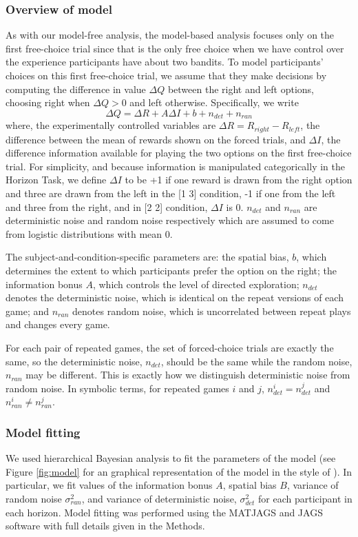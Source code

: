 \documentclass[12pt]{article}
\begin{document}
	\subsubsection*{Overview of model}
	As with our model-free analysis, the model-based analysis focuses only on the first free-choice trial since that is the only free choice when we have control over the experience participants have about two bandits. To model participants' choices on this first free-choice trial, we assume that they make decisions by computing the difference in value $\Delta Q$ between the right and left options, choosing right when $\Delta Q > 0$ and left otherwise.  Specifically, we write
	\begin{equation}
	\Delta Q= \Delta R+A \Delta I+b+n_{det}+n_{ran}
	\end{equation}
	where, the experimentally controlled variables are $\Delta R=R_{right}-R_{left}$, the difference between the mean of rewards shown on the forced trials, and $\Delta I$, the difference information available for playing the two options on the first free-choice trial. For simplicity, and because information is manipulated categorically in the Horizon Task, we define $\Delta I$ to be +1 if one reward is drawn from the right option and three are drawn from the left in the [1 3] condition, -1 if one from the left and three from the right, and in [2 2] condition, $\Delta I$ is 0. $n_{det}$ and $n_{ran}$ are deterministic noise and random noise respectively which are assumed to come from logistic distributions with mean 0.
	
	The subject-and-condition-specific parameters are: the spatial bias, $b$, which determines the extent to which participants prefer the option on the right; the information bonus $A$, which controls the level of directed exploration; $n_{det}$ denotes the deterministic noise, which is identical on the repeat versions of each game; and $n_{ran}$ denotes random noise, which is uncorrelated between repeat plays and changes every game.
	
	For each pair of repeated games, the set of forced-choice trials are exactly the same, so the deterministic noise, $n_{det}$, should be the same while the random noise, $n_{ran}$ may be different. This is exactly how we distinguish deterministic noise from random noise. In symbolic terms, for repeated games $i$ and $j$,  $n_{det}^i=n_{det}^j$  and $n_{ran}^i \neq n_{ran}^j$.
	
	
	\subsubsection*{Model fitting}
	We used hierarchical Bayesian analysis to fit the parameters of the model (see Figure \ref{fig:model} for an graphical representation of the model in the style of \cite{lee2014}). In particular, we fit values of the information bonus $A$, spatial bias $B$, variance of random noise $\sigma_{ran}^2$, and variance of deterministic noise, $\sigma_{det}^2$ for each participant in each horizon. Model fitting was performed using the MATJAGS and JAGS software \citep{jags, matjags} with full details given in the Methods.  
	
\end{document}
